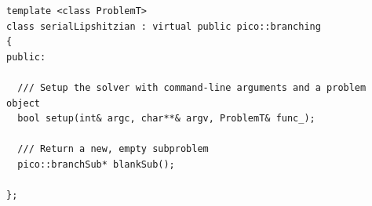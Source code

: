 {\small
\begin{verbatim}
template <class ProblemT>
class serialLipshitzian : virtual public pico::branching
{
public:

  /// Setup the solver with command-line arguments and a problem object
  bool setup(int& argc, char**& argv, ProblemT& func_);

  /// Return a new, empty subproblem
  pico::branchSub* blankSub();

};
\end{verbatim}
}
